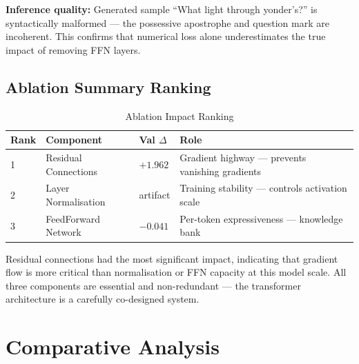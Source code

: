 \documentclass[12pt,a4paper]{article}
\newenvironment{keyinsight}{%
  \begin{tcolorbox}[colback=lightblue!70, colframe=navyblue,
    fonttitle=\bfseries\small\color{black},
    title={Key Insight}, boxrule=0.6pt,
    left=6pt, right=6pt, top=4pt, bottom=4pt, breakable]%
  \color{black}%
}{\end{tcolorbox}}
\begin{document}
\textbf{Inference quality:} Generated sample ``What light through yonder's?'' is syntactically malformed — the possessive apostrophe and question mark are incoherent. This confirms that numerical loss alone underestimates the true impact of removing FFN layers.

\subsection{Ablation Summary Ranking}

\begin{table}[H]
\centering
\caption{Ablation Impact Ranking}
\renewcommand{\arraystretch}{1.3}
\begin{tabular}{C{1cm}L{4cm}C{2.5cm}L{5cm}}
  \toprule
  \textbf{Rank} & \textbf{Component} & \textbf{Val $\Delta$} & \textbf{Role} \\
   & Residual Connections & $+1.962$ & Gradient highway — prevents vanishing gradients \\
  2 & Layer Normalisation  & artifact  & Training stability — controls activation scale \\
  3 & FeedForward Network  & $-0.041$  & Per-token expressiveness — knowledge bank \\
  \bottomrule
\end{tabular}
\end{table}

\begin{keyinsight}
Residual connections had the most significant impact, indicating that gradient flow is more critical than normalisation or FFN capacity at this model scale. All three components are essential and non-redundant — the transformer architecture is a carefully co-designed system.
\end{keyinsight}

\newpage
\section{Comparative Analysis}
\end{document}
